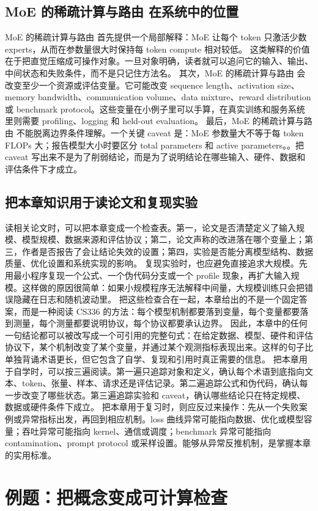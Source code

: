 \documentclass[a4paper]{article}
\begin{document}
\subsection{MoE 的稀疏计算与路由 在系统中的位置}
MoE 的稀疏计算与路由 首先提供一个局部解释：MoE 让每个 token 只激活少数 experts，从而在参数量很大时保持每 token compute 相对较低。 这类解释的价值在于把直觉压缩成可操作对象。一旦对象明确，读者就可以追问它的输入、输出、中间状态和失败条件，而不是只记住方法名。
其次，MoE 的稀疏计算与路由 会改变至少一个资源或评估变量。它可能改变 sequence length、activation size、memory bandwidth、communication volume、data mixture、reward distribution 或 benchmark protocol。这些变量在小例子里可以手算，在真实训练和服务系统里则需要 profiling、logging 和 held-out evaluation。
最后，MoE 的稀疏计算与路由 不能脱离边界条件理解。一个关键 caveat 是：MoE 参数量大不等于每 token FLOPs 大；报告模型大小时要区分 total parameters 和 active parameters。。把 caveat 写出来不是为了削弱结论，而是为了说明结论在哪些输入、硬件、数据和评估条件下才成立。
\subsection{把本章知识用于读论文和复现实验}
读相关论文时，可以把本章变成一个检查表。第一，论文是否清楚定义了输入规模、模型规模、数据来源和评估协议；第二，论文声称的改进落在哪个变量上；第三，作者是否报告了会让结论失效的设置；第四，实验是否能分离模型结构、数据质量、优化设置和系统实现的影响。
复现实验时，也应避免直接追求大规模。先用最小程序复现一个公式、一个伪代码分支或一个 profile 现象，再扩大输入规模。这样做的原因很简单：如果小规模程序无法解释中间量，大规模训练只会把错误隐藏在日志和随机波动里。
把这些检查合在一起，本章给出的不是一个固定答案，而是一种阅读 CS336 的方法：每个模型机制都要落到变量，每个变量都要落到测量，每个测量都要说明协议，每个协议都要承认边界。
因此，本章中的任何一句结论都可以被改写成一个可引用的完整句式：在给定数据、模型、硬件和评估协议下，某个机制改变了某个变量，并通过某个观测指标表现出来。这样的句子比单独背诵术语更长，但它包含了自学、复现和引用时真正需要的信息。
把本章用于自学时，可以按三遍阅读。第一遍只追踪对象和定义，确认每个术语到底指向文本、token、张量、样本、请求还是评估记录。第二遍追踪公式和伪代码，确认每一步改变了哪些状态。第三遍追踪实验和 caveat，确认哪些结论只在特定规模、数据或硬件条件下成立。
把本章用于复习时，则应反过来操作：先从一个失败案例或异常指标出发，再回到相应机制。loss 曲线异常可能指向数据、优化或模型容量；吞吐异常可能指向 kernel、通信或调度；benchmark 异常可能指向 contamination、prompt protocol 或采样设置。能够从异常反推机制，是掌握本章的实用标准。
\section{例题：把概念变成可计算检查}
\end{document}
